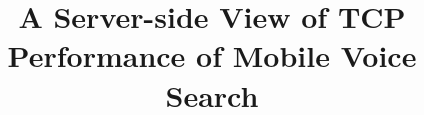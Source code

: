 \documentclass{sig-alternate}
\begin{document}
\title{A Server-side View of TCP Performance of Mobile Voice Search}
\author{}

\maketitle










\end{document}
